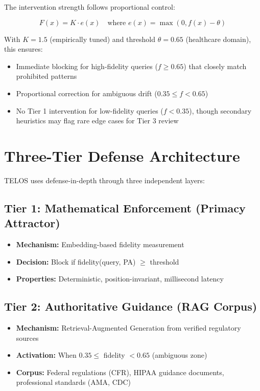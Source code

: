 \documentclass[11pt,a4paper]{article}
\begin{document}
The intervention strength follows proportional control:

\begin{equation}
F(x) = K \cdot e(x) \quad \text{where } e(x) = \max(0, f(x) - \theta)
\end{equation}

With $K=1.5$ (empirically tuned) and threshold $\theta=0.65$ (healthcare domain), this ensures:
\begin{itemize}
\item Immediate blocking for high-fidelity queries ($f \geq 0.65$) that closely match prohibited patterns
\item Proportional correction for ambiguous drift ($0.35 \leq f < 0.65$)
\item No Tier 1 intervention for low-fidelity queries ($f < 0.35$), though secondary heuristics may flag rare edge cases for Tier 3 review
\end{itemize}

\section{Three-Tier Defense Architecture}

TELOS uses defense-in-depth through three independent layers:

\subsection{Tier 1: Mathematical Enforcement (Primacy Attractor)}

\begin{itemize}
\item \textbf{Mechanism:} Embedding-based fidelity measurement
\item \textbf{Decision:} Block if fidelity(query, PA) $\geq$ threshold
\item \textbf{Properties:} Deterministic, position-invariant, millisecond latency
\end{itemize}

\subsection{Tier 2: Authoritative Guidance (RAG Corpus)}

\begin{itemize}
\item \textbf{Mechanism:} Retrieval-Augmented Generation from verified regulatory sources
\item \textbf{Activation:} When $0.35 \leq$ fidelity $< 0.65$ (ambiguous zone)
\item \textbf{Corpus:} Federal regulations (CFR), HIPAA guidance documents, professional standards (AMA, CDC)
\end{itemize}
\end{document}

